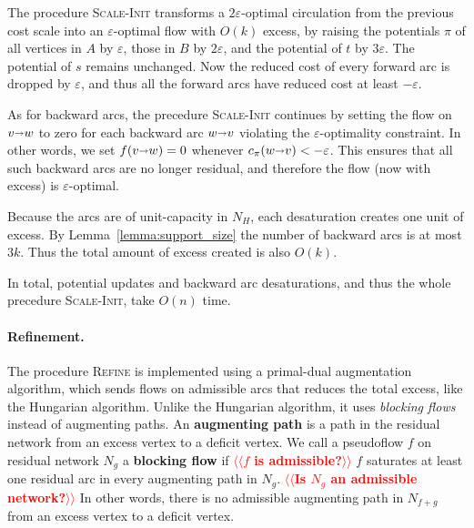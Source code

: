 \documentclass[11pt]{article}
\makeatletter
\def\eps{\varepsilon}
\def\fsupply{\phi}
\def\arcto{\mathord\shortrightarrow}
\def\arc#1#2{#1\arcto#2}
\theoremstyle{plain}
\numberwithin{figure}{section}
\def\EMPH#1{\textbf{\boldmath #1}}
\def\n@te#1{\textsf{\boldmath \textbf{$\langle\!\langle$#1$\rangle\!\rangle$}}\leavevmode}
\def\note#1{\textcolor{red}{\n@te{#1}}}
\makeatother
\begin{document}
The procedure \textsc{Scale-Init} transforms a $2\eps$-optimal circulation from the previous cost scale into an $\eps$-optimal flow with $O(k)$ excess, by raising the potentials $\pi$ of all vertices in $A$ by $\eps$, those in $B$ by $2\eps$, and the potential of $t$ by $3\eps$.  The potential of $s$ remains unchanged.
%
Now the reduced cost of every forward arc is dropped by $\eps$, and thus all the forward arcs have reduced cost at least $-\eps$.

As for backward arcs, the precedure \textsc{Scale-Init} continues by setting the flow on $\arc vw$ to zero for each backward arc $\arc wv$ violating the $\eps$-optimality constraint.  In other words, we set $f(\arc vw) = 0$ whenever $c_\pi(\arc wv) < -\eps$.  This ensures that all such backward arcs are no longer residual, and therefore the flow (now with excess) is $\eps$-optimal.

Because the arcs are of unit-capacity in $N_H$, each desaturation creates one unit of excess.
By Lemma~\ref{lemma:support_size} the number of backward arcs is at most $3k$.
Thus the total amount of excess created is also $O(k)$.

In total, potential updates and backward arc desaturations, and thus the whole precedure \textsc{Scale-Init}, take $O(n)$ time.


\paragraph{Refinement.}

The procedure \textsc{Refine} is implemented using a primal-dual augmentation algorithm,
which sends flows on admissible arcs that reduces the total excess, like the Hungarian algorithm.
Unlike the Hungarian algorithm,
it uses \emph{blocking flows} instead of augmenting paths.
%
An \EMPH{augmenting path} is a path in the residual network from an excess vertex to a deficit vertex.
We call a pseudoflow $f$ on residual network $N_g$ a \EMPH{blocking flow} if \note{$f$ is admissible?} $f$ saturates at least one residual arc in every augmenting path in $N_g$. \note{Is $N_g$ an admissible network?}
In other words, there is no admissible augmenting path in $N_{f+g}$ from an excess vertex to a deficit vertex.

\end{document}
